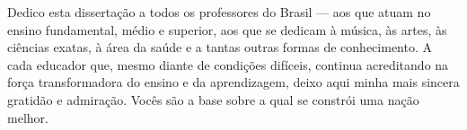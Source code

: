 Dedico esta dissertação a todos os professores do Brasil — aos que atuam no ensino fundamental, médio e superior, aos que se dedicam à música, às artes, às ciências exatas, à área da saúde e a tantas outras formas de conhecimento. A cada educador que, mesmo diante de condições difíceis, continua acreditando na força transformadora do ensino e da aprendizagem, deixo aqui minha mais sincera gratidão e admiração. Vocês são a base sobre a qual se constrói uma nação melhor.
